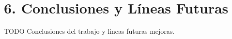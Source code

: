 \chapter*{6. Conclusiones y Líneas Futuras}\label{cap:conclusions}

TODO Conclusiones del trabajo y lineas futuras mejoras.